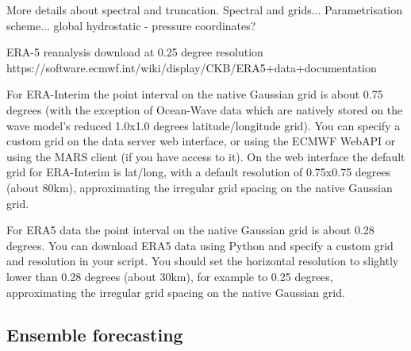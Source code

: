 More details about spectral and truncation. Spectral and grids...
Parametrisation scheme...
global
hydrostatic - pressure coordinates?




ERA-5 reanalysis download at 0.25 degree resolution
https://software.ecmwf.int/wiki/display/CKB/ERA5+data+documentation


For ERA-Interim the point interval on the native Gaussian grid is about 0.75 degrees (with the exception of Ocean-Wave data which are natively stored on the wave model’s reduced 1.0x1.0 degrees latitude/longitude grid). You can specify a custom grid on the data server web interface, or using the ECMWF WebAPI or using the MARS client (if you have access to it).  On the web interface the default grid for ERA-Interim is lat/long, with a default resolution of 0.75x0.75 degrees (about 80km), approximating the irregular grid spacing on the native Gaussian grid.

For ERA5 data the point interval on the native Gaussian grid is about 0.28 degrees. You can download ERA5 data using Python and specify a custom grid and resolution in your script. You should set the horizontal resolution to slightly lower than 0.28 degrees (about 30km), for example to 0.25 degrees, approximating the irregular grid spacing on the native Gaussian grid.



\subsection{Ensemble forecasting}

